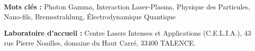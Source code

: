 \documentclass[11pt]{book}
\begin{document}
\vspace{.3cm}

\noindent\textbf{Mots clés :} Photon Gamma, Interaction Laser-Plasma, Physique des Particules, Nano-fils, Bremsstrahlung, Électrodynamique Quantique

\vspace{.3cm}

\noindent\textbf{Laboratoire d'accueil :} Centre Lasers Intenses et Applications (C.E.L.I.A.), 43 rue Pierre Noailles, domaine du Haut Carré, 33400 TALENCE.
\end{document}
